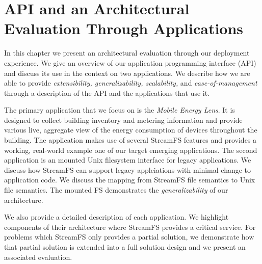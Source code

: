 \chapter{API and an Architectural Evaluation Through Applications}
\label{chap:ArchEvalMain}

In this chapter we present an architectural evaluation through our deployment experience.  We give an overview of
our application programming interface (API) and discuss its use in the context on two applications.  We describe
how we are able to provide \emph{extensibility, generalizability, scalability,} and \emph{ease-of-management}
through a description of the API and the applications that use it.

The primary application that we focus on is the \emph{Mobile Energy Lens}.  It is designed to collect building 
inventory and metering information and provide various live, aggregate view of the energy consumption of devices throughout the building.
The application makes use of several StreamFS features and provides a working, real-world example one of our target
emerging applications.  The second application is an mounted Unix filesystem interface for legacy applications.
We discuss how StreamFS can support legacy applciations with minimal change to application code.  We discuss 
the mapping from StreamFS file semantics to Unix file semantics.  The mounted FS demonstrates the \emph{generalizability}
of our architecture.

We also provide a detailed description of each application.  We highlight components of their architecture
where StreamFS provides a critical service.  For problems which StreamFS only provides a partial solution, we demonstrate 
how that partial solution is extended into a full solution design and we present an associated evaluation.



% 

% 




